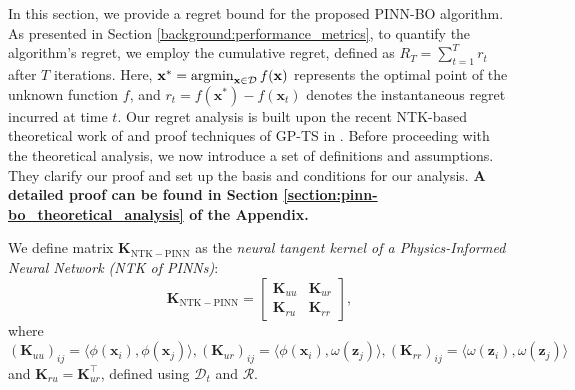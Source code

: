 In this section, we provide a regret bound for the proposed PINN-BO algorithm. As presented in Section \ref{background:performance_metrics}, to quantify the algorithm's regret, we employ the cumulative regret, defined as $R_T = \sum_{t=1}^T r_t$ after $T$ iterations. Here, $\mathbf{x}^* = \operatorname*{argmin}_{\mathbf{x} \in \mathcal{D}} f(\mathbf{x})$ represents the optimal point of the unknown function $f$, and $r_t = f(\mathbf{x^*}) - f(\mathbf{x}_t)$ denotes the instantaneous regret incurred at time $t$. Our regret analysis is built upon the recent NTK-based theoretical work of \citet{wang2022and} and proof techniques of GP-TS in \citet{chowdhury2017kernelized}. Before proceeding with the theoretical analysis, we now introduce a set of definitions and assumptions. They clarify our proof and set up the basis and conditions for our analysis. \textbf{A detailed proof can be found in Section \ref{section:pinn-bo_theoretical_analysis} of the Appendix.}   
\begin{definition}
    We define matrix $\mathbf{K}_\mathrm{NTK-PINN}$ as  the \textit{neural tangent kernel of a Physics-Informed Neural Network (NTK of PINNs)}: 
\begin{equation}
\renewcommand\arraystretch{1.2}
    \label{definition:PINN-NTKs}
\mathbf{K}_\mathrm{NTK-PINN} = 
\begin{bmatrix}
    \mathbf{K}_{uu} & \mathbf{K}_{ur} \\
    \mathbf{K}_{ru} & \mathbf{K}_{rr}
\end{bmatrix},
\end{equation}
where $(\mathbf{K}_{uu})_{ij} = \langle \phi(\mathbf{x}_i), \phi(\mathbf{x}_j) \rangle, 
 (\mathbf{K}_{ur})_{ij} = \langle \phi(\mathbf{x}_i), \omega(\mathbf{z}_j) \rangle, (\mathbf{K}_{rr})_{ij} = \langle \omega(\mathbf{z}_i), \omega(\mathbf{z}_j) \rangle$ and $\mathbf{K}_{ru} = \mathbf{K}_{ur}^\top$, defined using $\mathcal{D}_t$ and $\mathcal R$. 
\end{definition}

